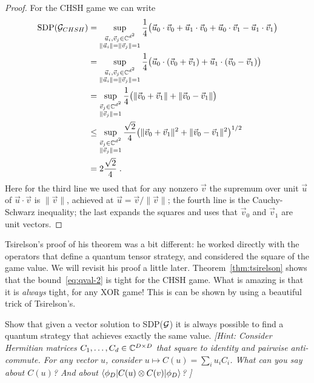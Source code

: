 \begin{proof}
For the CHSH game we can write
\begin{align*}
\text{SDP}(\mathcal{G}_{CHSH}) &= \sup_{\substack{\vec{u}_i,\vec{v}_j\in \mathbb{C}^{d^2}\\ \|\vec{u}_i\|=\|\vec{v}_j\|=1}} \frac{1}{4} \big(\vec{u}_0 \cdot \vec{v}_0 + \vec{u}_1 \cdot \vec{v}_0 + \vec{u}_0 \cdot \vec{v}_1 - \vec{u}_1 \cdot \vec{v}_1\big)\\
 &= \sup_{\substack{\vec{u}_i,\vec{v}_j\in \mathbb{C}^{d^2}\\ \|\vec{u}_i\|=\|\vec{v}_j\|=1}} \frac{1}{4} \big(\vec{u}_0 \cdot (\vec{v}_0 + \vec{v}_1) +  \vec{u}_1 \cdot (\vec{v}_0 -\vec{v}_1)\big)\\
 & = \sup_{\substack{\vec{v}_j\in \mathbb{C}^{d^2}\\ \|\vec{v}_j\|=1}} \frac{1}{4} \big(\|\vec{v}_0 + \vec{v}_1\| + \|\vec{v}_0 -\vec{v}_1\| \big)\\
 & \leq \sup_{\substack{\vec{v}_j\in \mathbb{C}^{d^2}\\ \|\vec{v}_j\|=1}} \frac{\sqrt{2}}{4} \big( \|\vec{v}_0 + \vec{v}_1\|^2 + \|\vec{v}_0 -\vec{v}_1\|^2\big)^{1/2} \\
&= 2\frac{\sqrt{2}}{4} \;.
\end{align*}
Here for the third line we used that for any nonzero $\vec{v}$ the supremum over unit $\vec{u}$ of $\vec{u}\cdot \vec{v}$ is $\|\vec{v}\|$, achieved at $\vec{u} = \vec{v}/\|\vec{v}\|$; the fourth line is the Cauchy-Schwarz inequality; the last expands the squares and uses that $\vec{v}_0$ and $\vec{v}_1$ are unit vectors. 
\end{proof}

Tsirelson's proof of his theorem was a bit different: he worked directly with the operators that define a quantum tensor strategy, and considered the square of the game value. We will revisit his proof a little later. 
Theorem~\ref{thm:tsirelson} shows that the bound~\eqref{eq:qval-2} is tight for the CHSH game. What is amazing is that it is \emph{always} tight, for any XOR game! This is can be shown by using a beautiful trick of Tsirelson's. 

\begin{exercise}\label{ex:tsirelson}
Show that given a vector solution to SDP($\mathcal{G}$) it is always possible to find a quantum strategy that achieves exactly the same value. \emph{[Hint: Consider Hermitian matrices $C_1,\ldots,C_d \in \mathbb{C}^{D\times D}$ that square to identity and pairwise anti-commute. For any vector $u$, consider $u\mapsto C(u) = \sum_i u_i C_i$. What can you say about $C(u)$? And about $\langle\phi_{D}| C(u) \otimes C(v)|\phi_D\rangle$? ]}
\end{exercise}

